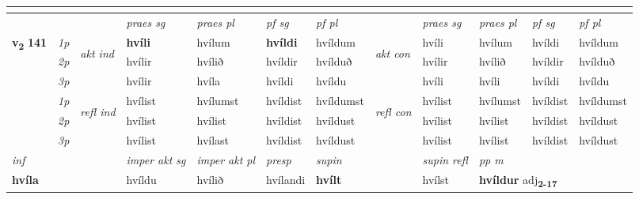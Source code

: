 \begin{longtable}[l]{X>{\footnotesize\itshape}llXXXXlXXXX}
  & \\
   \midrule
 & &   & \textit{praes sg}  & \textit{praes pl}    & \textit{ pf sg} & \textit{pf pl} & & \textit{praes sg}  & \textit{praes pl}    & \textit{pf sg} & \textit{pf pl }  \\ \cmidrule{4-7} \cmidrule{9-12}
 \multirow{2}{*}{{{\textbf{v{\textsubscript{2}}} \Large{\textbf{141}}}}}  & 1p & \multirow{3}{*}{\begin{turn}{90}\textit{akt ind}\end{turn}} & \textbf{hvíli} & hvílum & \textbf{hvíldi} & hvíldum & \multirow{3}{*}{\begin{turn}{90}\textit{akt con}\end{turn}} &hvíli & hvílum & hvíldi & hvíldum\\*
 & 2p &  &  hvílir  & hvílið & hvíldir & hvílduð & & hvílir & hvílið & hvíldir & hvílduð \\*
 & 3p &  & hvílir & hvíla & hvíldi & hvíldu & & hvíli & hvíli& hvíldi & hvíldu \\*
\cmidrule{4-7} \cmidrule{9-12}
 & 1p & \multirow{3}{*}{\begin{turn}{90}\textit{refl ind}\end{turn}}  & hvílist & hvílumst & hvíldist & hvíldumst & \multirow{3}{*}{\begin{turn}{90}\textit{refl con}\end{turn}}  &hvílist & hvílumst & hvíldist & hvíldumst \\*
 & 2p &  & hvílist & hvílist & hvíldist & hvíldust & &hvílist & hvílist & hvíldist & hvíldust \\*
 & 3p  & & hvílist & hvílast & hvíldist & hvíldust & & hvílist & hvílist& hvíldist & hvíldust \\*
\cmidrule{4-7} \cmidrule{9-12}

   {\textit{inf}} & &  & \textit{imper akt sg} & \textit{imper akt pl}   & \textit{presp} & \textit{supin} && \textit{supin refl} & \textit{pp m} \\*
  {\textbf{hvíla}} & && hvíldu  & hvílið   & hvílandi &  \textbf{hvílt} && hvílst & \multicolumn{2}{l}{\textbf{hvíldur} adj\textbf{\textsubscript{2-17}}} \\*

\midrule


\end{longtable}

